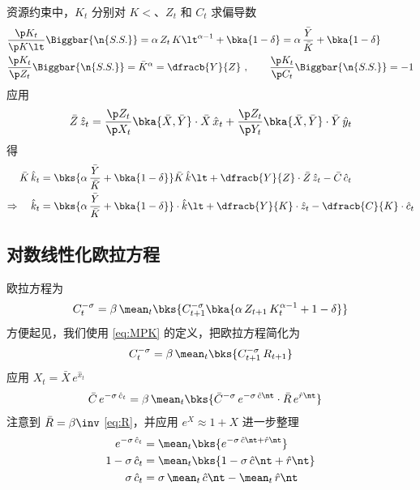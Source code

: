
资源约束中，\(K_t\) 分别对 \(K\lt\)、\(Z_t\) 和 \(C_t\) 求偏导数
\begin{align*}
    &\dfrac{\p K_t}{\p K\lt}\Biggbar{\n{S.S.}}=\alpha\,Z_t\,K\lt^{\alpha-1}+\bka{1-\delta}=\alpha\,\dfrac{\bar Y}{\bar K}+\bka{1-\delta}\\
    &\dfrac{\p K_t}{\p Z_t}\Biggbar{\n{S.S.}}=\bar K^\alpha=\dfracb{Y}{Z} \ ,\qquad \dfrac{\p K_t}{\p C_t}\Biggbar{\n{S.S.}}=-1
\end{align*}
应用
\begin{equation*}
    \bar Z\,\hat z_t=\dfrac{\p Z_t}{\p X_t}\bka{\bar X,\bar Y}\cdot\bar X\,\hat x_t+\dfrac{\p Z_t}{\p Y_t}\bka{\bar X,\bar Y}\cdot\bar Y\,\hat y_t
\end{equation*}
得
\begin{align*}
    \bar K\,\hat k_t&=\bks{\alpha\,\dfrac{\bar Y}{\bar K}+\bka{1-\delta}}\bar K\,\hat k\lt+\dfracb{Y}{Z}\cdot\bar Z\,\hat z_t-\bar C\,\hat c_t\\
    \Rightarrow\quad \hat k_t&=\bks{\alpha\,\dfrac{\bar Y}{\bar K}+\bka{1-\delta}}\cdot\hat k\lt+\dfracb{Y}{K}\cdot\hat z_t-\dfracb{C}{K}\cdot\hat c_t
\end{align*}

\subsection{对数线性化欧拉方程}

欧拉方程为
\begin{equation*}
    C_t^{-\sigma}=\beta\,\mean_t\bks{C_{t+1}^{-\sigma}\bka{\alpha\, Z_{t+1}\,K_t^{\alpha-1}+1-\delta}}
\end{equation*}
方便起见，我们使用 \ref{eq:MPK} 的定义，把欧拉方程简化为
\begin{equation*}
    C_t^{-\sigma}=\beta\,\mean_t\bks{C_{t+1}^{-\sigma}\,R_{t+1}}
\end{equation*}
应用 \(X_t=\bar X\,e^{\hat x_t}\) 
\begin{align*}
    \bar C\,e^{-\sigma\,\hat c_t}&=\beta\,\mean_t\bks{\bar C^{-\sigma}\,e^{-\sigma\,\hat c\nt}\cdot\bar R\,e^{\hat r\nt}}
\end{align*}
注意到 \(\bar R=\beta\inv\) \ref{eq:R}，并应用 \(e^X\approx1+X\) 进一步整理
\begin{align}
    e^{-\sigma\,\hat c_t}&=\mean_t\bks{e^{-\sigma\,\hat c\nt+\hat r\nt}}\notag\\
    1-\sigma\,\hat c_t&=\mean_t\bks{1-\sigma\,\hat c\nt+\hat r\nt}\notag\\
    \sigma\,\hat c_t&=\sigma\,\mean_t\,\hat c\nt-\mean_t\,\hat r\nt\label{eq:LogLinEuler}
\end{align}

